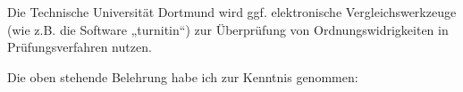 Die Technische Universität Dortmund wird ggf. elektronische Vergleichswerkzeuge (wie z.B. die 
Software „turnitin“) zur Überprüfung von Ordnungswidrigkeiten in Prüfungsverfahren nutzen. 

Die oben stehende Belehrung habe ich zur Kenntnis genommen: 
\vspace{\baselineskip}

\underline{}
\hspace{.25\textwidth}
\underline{\hspace{.3\textwidth}}
\newline
{}
\hspace{.25\textwidth}
\makeatother